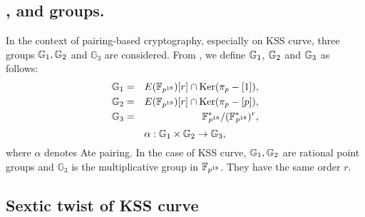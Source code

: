         \subsection{,  and  groups.} In the context of pairing-based cryptography, especially on KSS curve, three groups ${\mathbb{G}}_{1}, {\mathbb{G}}_{2}$ and $\mathbb{G}_3$ are considered. From \cite{mori}, we define ${\mathbb{G}}_{1}$, ${\mathbb{G}}_{2}$ and ${\mathbb{G}}_{3}$ as follows:
        \begin{eqnarray}\label{eq:g1}
        {\mathbb{G}}_{1} & = &  E({\mathbb{F}}_{p^{18}}) [r] \cap \text{Ker}(\pi_p - [1]), \nonumber \\
        {\mathbb{G}}_{2} & = &  E({\mathbb{F}}_{p^{18}}) [r] \cap \text{Ker}(\pi_p - [p]), \nonumber \\
        {\mathbb{G}}_{3} & = & {{\mathbb{F}}^{\ast}}_{\!\!\!p^{18}}/({{\mathbb{F}}^{\ast}}_{\!\!\!p^{18}})^r, \nonumber
        \end{eqnarray}
        \begin{equation}
        \alpha : {\mathbb{G}}_{1} \times {\mathbb{G}}_{2} \rightarrow {\mathbb{G}}_{3},
        \end{equation}
        where $\alpha$ denotes Ate pairing. In the case of KSS curve, ${\mathbb{G}}_{1}, {\mathbb{G}}_{2}$ are rational point groups and $\mathbb{G}_3$ is the multiplicative group in $\mathbb{F}_{p^{18}}$. They have the same order $r$. 
        
        \subsection{Sextic twist of KSS curve}
        
